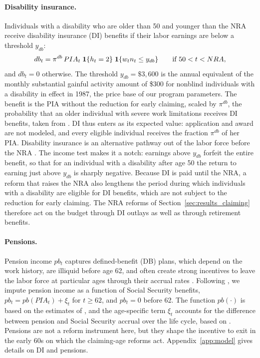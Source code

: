 \paragraph{Disability insurance.} Individuals with a disability who are older than 50 and younger than the NRA receive disability insurance (DI) benefits if their labor earnings are below a threshold $y_{db}$:
\begin{equation}\label{eq:di}
db_t=\pi^{db}\,PIA_t\;\mathbf{1}\{h_t=2\}\;\mathbf{1}\{w_t n_t\leq y_{db}\} \qquad \text{if } 50<t<NRA,
\end{equation}
and $db_t=0$ otherwise. The threshold $y_{db}=\$3{,}600$ is the annual equivalent of the monthly substantial gainful activity amount of \$300 for nonblind individuals with a disability in effect in 1987, the price base of our program parameters. The benefit is the PIA without the reduction for early claiming, scaled by $\pi^{db}$, the probability that an older individual with severe work limitations receives DI benefits, taken from \citet{Low2015}. DI thus enters as its expected value: application and award are not modeled, and every eligible individual receives the fraction $\pi^{db}$ of her PIA.
Disability insurance is an alternative pathway out of the labor force before the NRA \citep{Low2015,Yu2024}. The income test makes it a notch: earnings above $y_{db}$ forfeit the entire benefit, so that for an individual with a disability after age 50 the return to earning just above $y_{db}$ is sharply negative. Because DI is paid until the NRA, a reform that raises the NRA also lengthens the period during which individuals with a disability are eligible for DI benefits, which are not subject to the reduction for early claiming. The NRA reforms of Section~\ref{sec:results_claiming} therefore act on the budget through DI outlays as well as through retirement benefits.

\paragraph{Pensions.} Pension income $pb_t$ captures defined-benefit (DB) plans, which depend on the work history, are illiquid before age 62, and often create strong incentives to leave the labor force at particular ages through their accrual rates \citep{Gustman2000,Ippolito1997}. Following \citet{french2005effects}, we impute pension income as a function of Social Security benefits, $pb_t=pb(PIA_t)+\xi_t$ for $t\geq 62$, and $pb_t=0$ before 62. The function $pb(\cdot)$ is based on the estimates of \citet{Gustman1999}, and the age-specific term $\xi_t$ accounts for the difference between pension and Social Security accrual over the life cycle, based on \citet{Gustman2000}. Pensions are not a reform instrument here, but they shape the incentive to exit in the early 60s on which the claiming-age reforms act. Appendix~\ref{app:model} gives details on DI and pensions.

